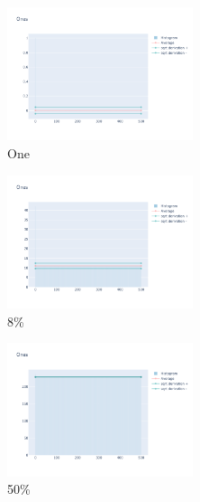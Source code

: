 \documentclass[12pt, fleqn]{report}                             %
\theoremstyle{break}                                            %
\begin{document}
      \begin{figure}[ht!]
        \centering
        \begin{subfigure}[b]{0.4\linewidth}
          \includegraphics[width=0.6\textwidth]{Images/232/dia-a.png}
          \caption{One}
        \end{subfigure}
        \begin{subfigure}[b]{0.4\linewidth}
          \includegraphics[width=0.6\textwidth]{Images/232/dia-b.png}
          \caption{8\%}
        \end{subfigure}
        \begin{subfigure}[b]{0.4\linewidth}
          \includegraphics[width=0.6\textwidth]{Images/232/dia-c.png}
          \caption{50\%}
        \end{subfigure}
        \begin{subfigure}[b]{0.4\linewidth}

\end{subfigure}
\end{figure}
\end{document}
